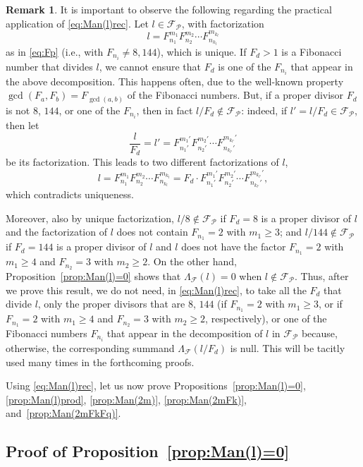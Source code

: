 \documentclass[11pt, a4paper]{article}
\newcommand{\manF}{\Lambda_{\mathcal{F}}}
\newcommand{\Fp}{\mathcal{F}_{\mathcal{P}}}
\theoremstyle{plain}
\theoremstyle{definition}
\newtheorem{remark}[theorem]{Remark}
\begin{document}
\begin{remark}
It is important to observe the following regarding the practical application of \eqref{eq:Man(l)rec}. Let $l \in \Fp$, with factorization
\[
l = F_{n_1}^{m_1}F_{n_2}^{m_2} \cdots F_{n_{k_l}}^{m_{k_l}}
\]
as in \eqref{eq:Fp} (i.e., with $F_{n_i} \ne 8,144$), which is unique.
If $F_d > 1$ is a Fibonacci number that divides $l$, we cannot ensure that $F_d$ is one of the $F_{n_i}$ that appear in the above decomposition. This happens often, due to the well-known property $\gcd(F_a,F_b) = F_{\gcd(a,b)}$ of the Fibonacci numbers. But, if a proper divisor $F_d$ is not $8$, $144$, or one of the $F_{n_i}$, then in fact $l/F_d \notin \Fp$:  indeed, if $l' = l/F_d \in \Fp$, then let
\[
  \frac{l}{F_d} = l' = F_{n_1'}^{m_1'} F_{n_2'}^{m_2'} \cdots F_{n_{k_{l'}}'}^{m_{k_{l'}}'}
\]
be its factorization. This leads to two different factorizations of $l$,
\[
 l = F_{n_1}^{m_1}F_{n_2}^{m_2} \cdots F_{n_{k_l}}^{m_{k_l}}
 = F_d \cdot F_{n_1'}^{m_1'} F_{n_2'}^{m_2'} \cdots F_{n_{k_{l'}}'}^{m_{k_{l'}}'},
\]
which contradicts uniqueness.

Moreover, also by unique factorization, $l/8 \notin \Fp$ if $F_d = 8$ is a proper divisor of $l$ and the factorization of $l$ does not contain $F_{n_1}=2$ with $m_1\ge 3$; and $l/144 \notin \Fp$ if $F_d = 144$ is a proper divisor of $l$ and $l$ does not have the factor $F_{n_1}=2$ with $m_1\ge 4$ and $F_{n_2}=3$ with $m_2\ge 2$.
On the other hand, Proposition~\ref{prop:Man(l)=0} shows that $\manF(l) = 0$ when $l \notin \Fp$. Thus, after we prove this result, we do not need, in \eqref{eq:Man(l)rec}, to take all the $F_d$ that divide $l$, only the proper divisors that are $8$, $144$ (if $F_{n_1}=2$ with $m_1\ge 3$, or if $F_{n_1}=2$ with $m_1\ge 4$ and $F_{n_2}=3$ with $m_2\ge 2$, respectively), or one of the Fibonacci numbers $F_{n_i}$ that appear in the decomposition of $l$ in $\Fp$ because, otherwise, the corresponding summand $\manF(l/F_d)$ is null. This will be tacitly used many times in the forthcoming proofs. 
\end{remark}

Using \eqref{eq:Man(l)rec}, let us now prove Propositions~\ref{prop:Man(l)=0}, 
\ref{prop:Man(l)prod}, \ref{prop:Man(2m)}, \ref{prop:Man(2mFk)}, 
and~\ref{prop:Man(2mFkFq)}.

\subsection{Proof of Proposition~\ref{prop:Man(l)=0}}
\end{document}
